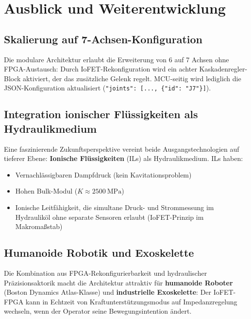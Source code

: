 ﻿\documentclass[a4paper,12pt]{scrreprt}
\theoremstyle{definition}
\begin{document}
\section{Ausblick und Weiterentwicklung}

\subsection{Skalierung auf 7-Achsen-Konfiguration}

Die modulare Architektur erlaubt die Erweiterung von 6 auf 7 Achsen
ohne FPGA-Austausch: Durch IoFET-Rekonfiguration wird ein achter
Kaskadenregler-Block aktiviert, der das zusätzliche Gelenk regelt.
MCU-seitig wird lediglich die JSON-Konfiguration aktualisiert
(\texttt{"joints": [..., \{"id": "J7"\}]}).

\subsection{Integration ionischer Flüssigkeiten als Hydraulikmedium}

Eine faszinierende Zukunftsperspektive vereint beide Ausgangstechnologien
auf tieferer Ebene: \textbf{Ionische Flüssigkeiten} (ILs) als
Hydraulikmedium. ILs haben:
\begin{itemize}
  \item Vernachlässigbaren Dampfdruck (kein Kavitationsproblem)
  \item Hohen Bulk-Modul ($K \approx \SI{2500}{\mega\pascal}$)
  \item Ionische Leitfähigkeit, die simultane Druck- und Strommessung
        im Hydrauliköl ohne separate Sensoren erlaubt (IoFET-Prinzip
        im Makromaßstab)
\end{itemize}

\subsection{Humanoide Robotik und Exoskelette}

Die Kombination aus FPGA-Rekonfigurierbarkeit und hydraulischer
Präzisionsaktorik macht die Architektur attraktiv für
\textbf{humanoide Roboter} (Boston Dynamics Atlas-Klasse) und
\textbf{industrielle Exoskelette}: Der IoFET-FPGA kann in Echtzeit
von Kraftunterstützungsmodus auf Impedanzregelung wechseln, wenn
der Operator seine Bewegungsintention ändert.
\end{document}
